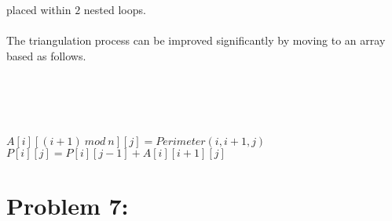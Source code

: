 \documentclass[12pt]{article}
\begin{document}
placed within $2$ nested loops.\\\\
The triangulation process can be improved significantly by moving to an
array based as follows.\\\\
\begin{algorithm}[H]
\\
\\
{
{
}
}
\\
{
{
$A[i][(i+1)\ mod\ n][j] = Perimeter(i,i+1,j)$
}
}
{
    {
        $P[i][j] = P[i][j-1]+A[i][i+1][j]$
    }
}

\end{algorithm}
\section*{Problem 7: }
\end{document}
